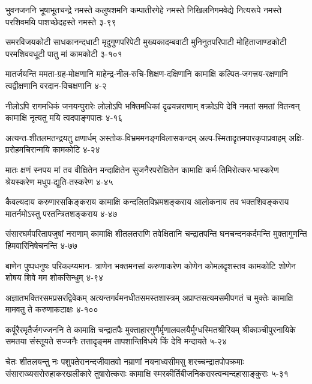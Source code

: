 \annofourlineindentedshloka
{भुवनजननि भूषाभूतचन्द्रे नमस्ते}
{कलुषशमनि कम्पातीरगेहे नमस्ते}
{निखिलनिगमवेद्ये नित्यरूपे नमस्ते}
{परशिवमयि पाशच्छेदहस्ते नमस्ते}
{३-९९}

\annofourlineindentedshloka
{समरविजयकोटी साधकानन्दधाटी}
{मृदुगुणपरिपेटी मुख्यकादम्बवाटी}
{मुनिनुतपरिपाटी मोहिताजाण्डकोटी}
{परमशिववधूटी पातु मां कामकोटी}
{३-१०१}




\annofourlineindentedshloka
{मातर्जयन्ति ममता-ग्रह-मोक्षणानि}
{माहेन्द्र-नील-रुचि-शिक्षण-दक्षिणानि}
{कामाक्षि कल्पित-जगत्त्रय-रक्षणानि}
{त्वद्वीक्षणानि वरदान-विचक्षणानि}
{४-२}

\annofourlineindentedshloka
{नीलोऽपि रागमधिकं जनयन्पुरारेः}
{लोलोऽपि भक्तिमधिकां दृढयन्नराणाम्}
{वक्रोऽपि देवि नमतां समतां वितन्वन्}
{कामाक्षि नृत्यतु मयि त्वदपाङ्गपातः}
{४-१६}

\annofourlineindentedshloka
{अत्यन्त-शीतलमतन्द्रयतु क्षणार्धम्}
{अस्तोक-विभ्रममनङ्गविलासकन्दम्}
{अल्प-स्मितादृतमपारकृपाप्रवाहम्}
{अक्षि-प्ररोहमचिरान्मयि कामकोटि}
{४-२४}

\annofourlineindentedshloka
{मातः क्षणं स्नपय मां तव वीक्षितेन}
{मन्दाक्षितेन सुजनैरपरोक्षितेन}
{कामाक्षि कर्म-तिमिरोत्कर-भास्करेण}
{श्रेयस्करेण मधुप-द्युति-तस्करेण}
{४-४५}

\annofourlineindentedshloka
{कैवल्यदाय करुणारसकिङ्कराय}
{कामाक्षि कन्दलितविभ्रमशङ्कराय}
{आलोकनाय तव भक्तशिवङ्कराय}
{मातर्नमोऽस्तु परतन्त्रितशङ्कराय}
{४-४७}

\annofourlineindentedshloka
{संसारघर्मपरितापजुषां नराणाम्}
{कामाक्षि शीतलतराणि तवेक्षितानि}
{चन्द्रातपन्ति घनचन्दनकर्दमन्ति}
{मुक्तागुणन्ति हिमवारिनिषेचनन्ति}
{४-७७}

\annofourlineindentedshloka
{बाणेन पुष्पधनुषः परिकल्प्यमान-}
{त्राणेन भक्तमनसां करुणाकरेण}
{कोणेन कोमलदृशस्तव कामकोटि}
{शोणेन शोषय शिवे मम शोकसिन्धुम्}
{४-९४}

\annofourlineindentedshloka
{अज्ञातभक्तिरसमप्रसरद्विवेकम्}
{अत्यन्तगर्वमनधीतसमस्तशास्त्रम्}
{अप्राप्तसत्यमसमीपगतं च मुक्तेः}
{कामाक्षि मामवतु ते करुणाकटाक्षः}
{४-१००}%



\annofourlineindentedshloka
{कर्पूरैरमृतैर्जगज्जननि ते कामाक्षि चन्द्रातपैः}
{मुक्ताहारगुणैर्मृणालवलयैर्मुग्धस्मितश्रीरियम्}
{श्रीकाञ्चीपुरनायिके समतया संस्तूयते सज्जनैः}
{तत्तादृङ्मम तापशान्तिविधये किं देवि मन्दायते}
{५-२४}

\annofourlineindentedshloka
{चेतः शीतलयन्तु नः पशुपतेरानन्दजीवातवो}
{नम्राणां नयनाध्वसीमसु शरच्चन्द्रातपोपक्रमाः}
{संसाराख्यसरोरुहाकरखलीकारे तुषारोत्कराः}
{कामाक्षि स्मरकीर्तिबीजनिकरास्त्वन्मन्दहासाङ्कुराः}
{५-३१}


